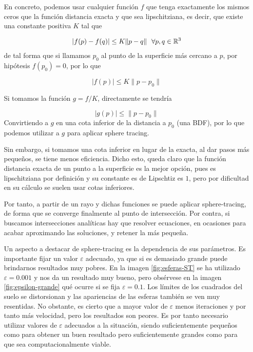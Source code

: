 En concreto, podemos usar cualquier función $f$ que tenga exactamente los mismos ceros que la función distancia exacta y que sea lipschitziana, es decir, que existe una constante positiva $K$ tal que

$$
|f(p)-f(q)|\leq K \|p-q\| \ \ \forall p,q\in\mathbb{R}^3 
$$
de tal forma que si llamamos $p_0$ al punto de la superficie más cercano a $p$, por hipótesis $f(p_0)=0$, por lo que

$$
|f(p)|\leq K \| p-p_0\|
$$

Si tomamos la función $g=f/K$, directamente se tendría 

$$
|g(p)|\leq\|p-p_0\|
$$
Convirtiendo a $g$ en una cota inferior de la distancia a $p_0$ (una BDF), por lo que podemos utilizar a $g$ para aplicar sphere tracing.

Sin embargo, si tomamos una cota inferior en lugar de la exacta, al dar pasos más pequeños, se tiene menos eficiencia. Dicho esto, queda claro que la función distancia exacta de un punto a la superficie es la mejor opción, pues es lipschitziana por definición y su constante es de Lipschtiz es $1$, pero por dificultad en su cálculo se suelen usar cotas inferiores.

Por tanto, a partir de un rayo y dichas funciones se puede aplicar sphere-tracing, de forma que se converge finalmente al punto de intersección. Por contra, si buscamos intersecciones analíticas hay que resolver ecuaciones, en ocasiones para acabar aproximando las soluciones, y retener la más pequeña. 

Un aspecto a destacar de sphere-tracing es la dependencia de sus parámetros. Es importante fijar un valor $\varepsilon$ adecuado, ya que si es demasiado grande puede brindarnos resultados muy pobres. En la imagen \ref{fig:esferas-ST} se ha utilizado $\varepsilon=0.001$ y nos da un resultado muy bueno, pero obsérvese en la imagen \ref{fig:epsilon-grande} qué ocurre si se fija $\varepsilon=0.1$. Los límites de los cuadrados del suelo se distorsionan y las apariencias de las esferas también se ven muy resentidas. No obstante, es cierto que a mayor valor de $\varepsilon$ menos iteraciones y por tanto más velocidad, pero los resultados son peores. Es por tanto necesario utilizar valores de $\varepsilon$ adecuados a la situación, siendo suficientemente pequeños como para obtener un buen resultado pero suficientemente grandes como para que sea computacionalmente viable.

